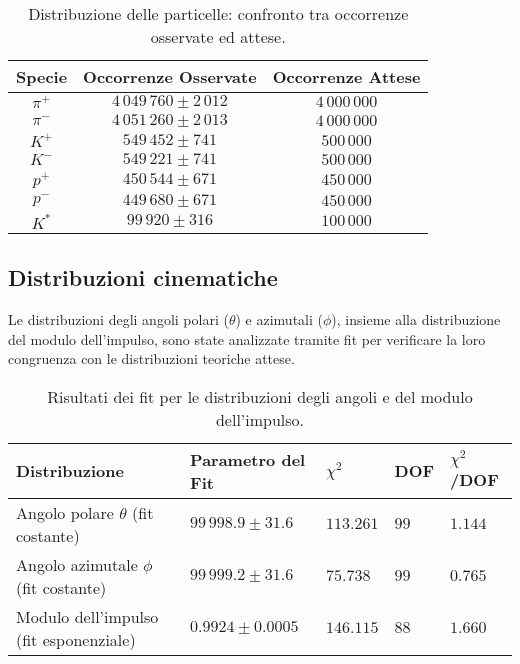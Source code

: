 \documentclass[a4paper,11pt]{article}
\begin{document}
\begin{table}[h!]
    \centering
    \begin{tabular}{|c|c|c|}
        \hline
        \textbf{Specie} & \textbf{Occorrenze Osservate} & \textbf{Occorrenze Attese} \\
        \hline
        $\pi^+$ & $4\,049\,760 \pm 2\,012$ & $4\,000\,000$ \\
        \hline
        $\pi^-$ & $4\,051\,260 \pm 2\,013$ & $4\,000\,000$ \\
        \hline
        $K^+$ & $549\,452 \pm 741$ & $500\,000$ \\
        \hline
        $K^-$ & $549\,221 \pm 741$ & $500\,000$ \\
        \hline
        $p^+$ & $450\,544 \pm 671$ & $450\,000$ \\
        \hline
        $p^-$ & $449\,680 \pm 671$ & $450\,000$ \\
        \hline
        $K^*$ & $99\,920 \pm 316$ & $100\,000$ \\
        \hline
    \end{tabular}
    \caption{Distribuzione delle particelle: confronto tra occorrenze osservate ed attese.}
    \label{tab:abbondanze}
\end{table}

\subsection{Distribuzioni cinematiche}

Le distribuzioni degli angoli polari ($\theta$) e azimutali ($\phi$), insieme alla distribuzione del modulo dell'impulso, sono state analizzate tramite fit per verificare la loro congruenza con le distribuzioni teoriche attese.

\begin{table}[h!]
    \centering
    \begin{tabular}{|m{3cm}|>{\centering\arraybackslash}m{3cm}|>{\centering\arraybackslash}m{1.5cm}|>{\centering\arraybackslash}m{1.5cm}|>{\centering\arraybackslash}m{1.5cm}|}
        \hline
        \textbf{Distribuzione} & \textbf{Parametro del Fit} & $\chi^2$ & \textbf{DOF} & $\chi^2$/DOF \\
        \hline
        Angolo polare $\theta$ (fit costante) & $99\,998.9 \pm 31.6$ & $113.261$ & $99$ & $1.144$ \\
        \hline
        Angolo azimutale $\phi$ (fit costante) & $99\,999.2 \pm 31.6$ & $75.738$ & $99$ & $0.765$ \\
        \hline
        Modulo dell'impulso (fit esponenziale) & $0.9924 \pm 0.0005$ & $146.115$ & $88$ & $1.660$ \\
        \hline
    \end{tabular}
    \caption{Risultati dei fit per le distribuzioni degli angoli e del modulo dell'impulso.}
    \label{tab:distribuzioni}
\end{table}
\end{document}
